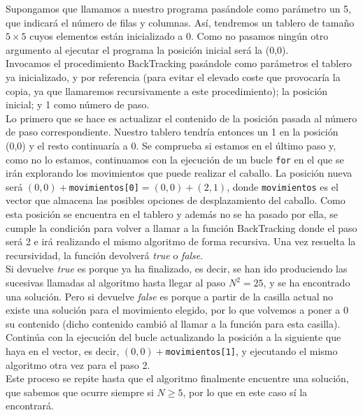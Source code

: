 \documentclass[11pt]{article}
\begin{document}
Supongamos que llamamos a nuestro  programa pasándole como parámetro un 5, que indicará el número de filas y columnas. Así, tendremos un tablero de tamaño $5\times5$ cuyos elementos están inicializado a 0. Como no pasamos ningún otro argumento al ejecutar el programa la posición inicial será la (0,0).\\

Invocamos el procedimiento BackTracking pasándole como parámetros el tablero ya inicializado, y por referencia (para evitar el elevado coste que provocaría la copia, ya que llamaremos recursivamente a este procedimiento); la posición inicial; y 1 como número de paso.\\

Lo primero que se hace es actualizar el contenido de la posición pasada al número de paso correspondiente. Nuestro tablero tendría entonces un 1 en la posición (0,0) y el resto continuaría a 0.
Se comprueba si estamos en el último paso y, como no lo estamos, continuamos con la ejecución de un bucle \verb|for| en el que se irán explorando los movimientos que puede realizar el caballo. La posición nueva será $(0,0)+$\verb|movimientos[0]|$=(0,0)+(2,1)$, donde \verb|movimientos| es el vector que almacena las posibles opciones de desplazamiento del caballo. Como esta posición se encuentra en el tablero y además no se ha pasado por ella, se cumple la condición para volver a llamar a la función BackTracking donde el paso será 2 e irá realizando el mismo algoritmo de forma recursiva. Una vez resuelta la recursividad, la función devolverá \textit{true} o \textit{false}.\\

Si devuelve \textit{true} es porque ya ha finalizado, es decir, se han ido produciendo las sucesivas llamadas al algoritmo hasta llegar al paso $N^2 = 25$, y se ha encontrado una solución. Pero si devuelve \textit{false} es porque a partir de la casilla actual no existe una solución para el movimiento elegido, por lo que volvemos a poner a 0 su contenido (dicho contenido cambió al llamar a la función para esta casilla). Continúa con la ejecución del bucle actualizando la posición a la siguiente que haya en el vector, es decir, $(0,0)+$\verb|movimientos[1]|, y ejecutando el mismo algoritmo otra vez para el paso 2.\\

Este proceso se repite hasta que el algoritmo finalmente encuentre una solución, que sabemos que ocurre siempre si $N\ge5$, por lo que en este caso sí la encontrará.
\end{document}
